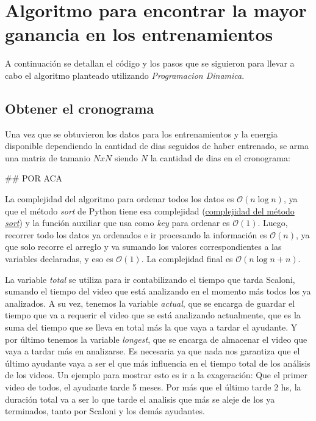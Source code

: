 \section{Algoritmo para encontrar la mayor ganancia en los entrenamientos}

A continuación se detallan el código y los pasos que se siguieron para llevar a cabo el algoritmo planteado utilizando \textit{Programacion Dinamica}.

\subsection{Obtener el cronograma}

Una vez que se obtuvieron los datos para los entrenamientos y la energia disponible dependiendo la cantidad de dias seguidos de haber entrenado, se arma una matriz de tamanio $NxN$ siendo $N$ la cantidad de dias en el cronograma:




## POR ACA



La complejidad del algoritmo para ordenar todos los datos es $\mathcal{O}\left(n \log n\right)$, ya que el método \textit{sort} de Python tiene esa complejidad (\href{https://www.geeksforgeeks.org/sort-in-python/}{complejidad del método \textit{sort}}) y la función auxiliar que usa como \textit{key} para ordenar es $\mathcal{O}(1)$. Luego, recorrer todo los datos ya ordenados e ir procesando la información es $\mathcal{O}(n)$, ya que solo recorre el arreglo y va sumando los valores correspondientes a las variables declaradas, y eso es $\mathcal{O}(1)$. La complejidad final es $\mathcal{O}\left(n \log n + n\right)$.

La variable \textit{total} se utiliza para ir contabilizando el tiempo que tarda Scaloni, sumando el tiempo del video que está analizando en el momento más todos los ya analizados. A su vez, tenemos la variable \textit{actual}, que se encarga de guardar el tiempo que va a requerir el video que se está analizando actualmente, que es la suma del tiempo que se lleva en total más la que vaya a tardar el ayudante. Y por último tenemos la variable \textit{longest}, que se encarga de almacenar el video que vaya a tardar más en analizarse. Es necesaria ya que nada nos garantiza que el último ayudante vaya a ser el que más influencia en el tiempo total de los análisis de los videos. Un ejemplo para mostrar esto es ir a la exageración: Que el primer video de todos, el ayudante tarde 5 meses. Por más que el último tarde 2 hs, la duración total va a ser lo que tarde el analisis que más se aleje de los ya terminados, tanto por Scaloni y los demás ayudantes.
